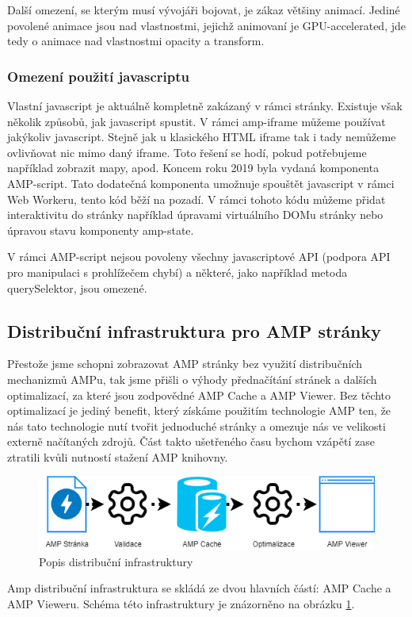 Další omezení, se kterým musí vývojáři bojovat, je zákaz většiny animací. Jediné povolené animace jsou nad vlastnostmi, jejichž animovaní je GPU-accelerated, jde tedy o animace nad vlastnostmi opacity a transform\cite{AMPCss}.

\subsubsection*{Omezení použití javascriptu}
Vlastní javascript je aktuálně kompletně zakázaný v rámci stránky. Existuje však několik způsobů, jak javascript spustit.
V rámci amp-iframe můžeme používat jakýkoliv javascript. Stejně jak u klasického HTML iframe tak i tady nemůžeme ovlivňovat nic mimo daný iframe. Toto řešení se hodí, pokud potřebujeme například zobrazit mapy, apod.
Koncem roku 2019 byla vydaná komponenta AMP-script. Tato dodatečná komponenta umožnuje spouštět javascript v rámci Web Workeru, tento kód běží na pozadí. V rámci tohoto kódu můžeme přidat interaktivitu do stránky například úpravami virtuálního DOMu stránky nebo úpravou stavu komponenty amp-state.

V rámci AMP-script nejsou povoleny všechny javascriptové API (podpora API pro manipulaci s prohlížečem chybí) a některé, jako například metoda querySelektor, jsou omezené\cite{amp-script}.

\subsection*{Distribuční infrastruktura pro AMP stránky}

Přestože jsme schopni zobrazovat AMP stránky bez využití distribučních mechanizmů AMPu, tak jsme přišli o výhody přednačítání stránek a dalších optimalizací, za které jsou zodpovědné AMP Cache a AMP Viewer.
Bez těchto optimalizací je jediný benefit, který získáme použitím technologie AMP ten, že nás tato technologie nutí tvořit jednoduché stránky a omezuje nás ve velikosti externě načítaných zdrojů. Část takto ušetřeného času bychom vzápětí zase ztratili kvůli nutností stažení AMP knihovny.

\begin{figure}[hbt]
	\centering
	\includegraphics[width=1\textwidth]{obrazky-figures/AmpDistribuce.png}
	\caption{Popis distribuční infrastruktury}
	\label{Popis Distribuční infrastruktury AMP}
\end{figure}
Amp distribuční infrastruktura se skládá ze dvou hlavních částí: AMP Cache a AMP Vieweru. Schéma této infrastruktury je znázorněno na obrázku \ref{Popis Distribuční infrastruktury AMP}.

